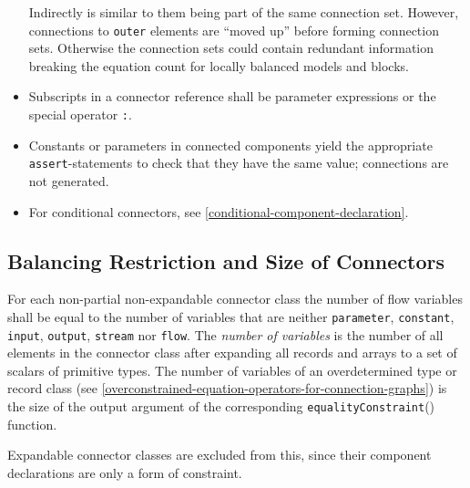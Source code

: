 \begin{itemize}
  \begin{nonnormative}
  Indirectly is similar to them being part of the same connection set.
  However, connections to \lstinline!outer! elements are ``moved up'' before forming connection sets.
  Otherwise the connection sets could contain redundant information breaking the equation count for locally balanced models and blocks.
  \end{nonnormative}
\item
  Subscripts in a connector reference shall be parameter expressions or the special operator \lstinline!:!.
\item
  Constants or parameters in connected components yield the appropriate \lstinline!assert!-statements to check that they have the same value; connections are not generated.
\item
  For conditional connectors, see \cref{conditional-component-declaration}.
\end{itemize}

\subsection{Balancing Restriction and Size of Connectors}\label{balancing-restriction-and-size-of-connectors}

For each non-partial non-expandable connector class the number of flow variables shall be equal to the number of variables that are neither \lstinline!parameter!, \lstinline!constant!, \lstinline!input!, \lstinline!output!, \lstinline!stream! nor \lstinline!flow!.
The \emph{number of variables} is the number of all elements in the connector class after expanding all records and arrays to a set of scalars of primitive types.
The number of variables of an overdetermined type or record class (see \cref{overconstrained-equation-operators-for-connection-graphs}) is the size of the output argument of the corresponding \lstinline!equalityConstraint!() function.
\begin{nonnormative}
Expandable connector classes are excluded from this, since their component declarations are only a form of constraint.
\end{nonnormative}

